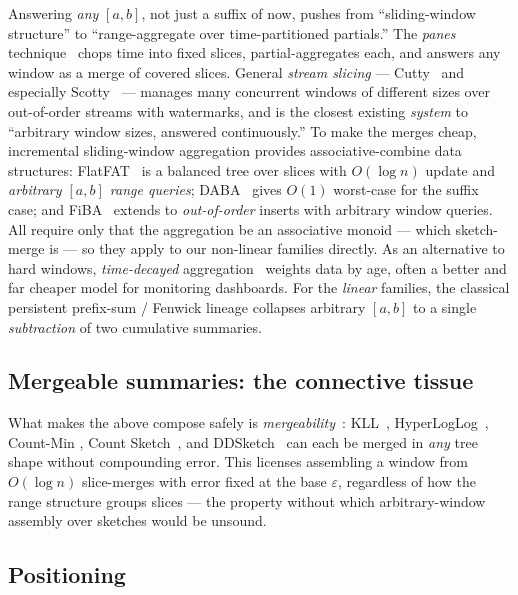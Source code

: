 Answering \emph{any} $[a,b]$, not just a suffix of now, pushes from
``sliding-window structure'' to ``range-aggregate over time-partitioned
partials.'' The \emph{panes} technique~\cite{li2005nopane} chops time into
fixed slices, partial-aggregates each, and answers any window as a merge
of covered slices. General \emph{stream slicing}
--- Cutty~\cite{carbone2016cutty} and especially
Scotty~\cite{traub2021scotty} --- manages many concurrent windows of
different sizes over out-of-order streams with watermarks, and is the
closest existing \emph{system} to ``arbitrary window sizes, answered
continuously.'' To make the merges cheap, incremental sliding-window
aggregation provides associative-combine data structures:
FlatFAT~\cite{tangwongsan2015flatfat} is a balanced tree over slices with
$O(\log n)$ update and \emph{arbitrary $[a,b]$ range queries};
DABA~\cite{tangwongsan2017daba} gives $O(1)$ worst-case for the suffix
case; and FiBA~\cite{tangwongsan2019fiba} extends to \emph{out-of-order}
inserts with arbitrary window queries. All require only that the
aggregation be an associative monoid --- which sketch-merge is --- so they
apply to our non-linear families directly. As an alternative to hard
windows, \emph{time-decayed} aggregation~\cite{cohen2003timedecay,
cormode2009forwarddecay} weights data by age, often a better and far
cheaper model for monitoring dashboards. For the \emph{linear} families,
the classical persistent prefix-sum / Fenwick lineage collapses arbitrary
$[a,b]$ to a single \emph{subtraction} of two cumulative summaries.

\subsection{Mergeable summaries: the connective tissue}

What makes the above compose safely is
\emph{mergeability}~\cite{agarwal2013mergeable}: KLL~\cite{karnin2016kll},
HyperLogLog~\cite{flajolet2007hyperloglog,ertl2017new}, Count-Min
\cite{cormode2005cm}, Count Sketch~\cite{charikar2002frequent}, and
DDSketch~\cite{masson2019ddsketch} can each be merged in \emph{any} tree
shape without compounding error. This licenses assembling a window from
$O(\log n)$ slice-merges with error fixed at the base $\varepsilon$,
regardless of how the range structure groups slices --- the property
without which arbitrary-window assembly over sketches would be unsound.

\subsection{Positioning}

